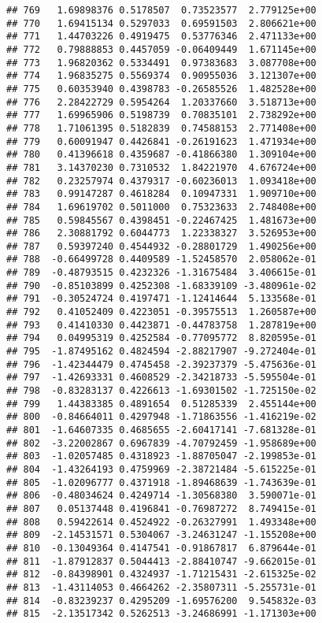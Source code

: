 \documentclass[
]{article}
\begin{document}
\begin{verbatim}
## 769   1.69898376 0.5178507  0.73523577  2.779125e+00
## 770   1.69415134 0.5297033  0.69591503  2.806621e+00
## 771   1.44703226 0.4919475  0.53776346  2.471133e+00
## 772   0.79888853 0.4457059 -0.06409449  1.671145e+00
## 773   1.96820362 0.5334491  0.97383683  3.087708e+00
## 774   1.96835275 0.5569374  0.90955036  3.121307e+00
## 775   0.60353940 0.4398783 -0.26585526  1.482528e+00
## 776   2.28422729 0.5954264  1.20337660  3.518713e+00
## 777   1.69965906 0.5198739  0.70835101  2.738292e+00
## 778   1.71061395 0.5182839  0.74588153  2.771408e+00
## 779   0.60091947 0.4426841 -0.26191623  1.471934e+00
## 780   0.41396618 0.4359687 -0.41866380  1.309104e+00
## 781   3.14370230 0.7310532  1.84221970  4.676724e+00
## 782   0.23257974 0.4379317 -0.60236013  1.093418e+00
## 783   0.99147287 0.4618284  0.10947331  1.909710e+00
## 784   1.69619702 0.5011000  0.75323633  2.748408e+00
## 785   0.59845567 0.4398451 -0.22467425  1.481673e+00
## 786   2.30881792 0.6044773  1.22338327  3.526953e+00
## 787   0.59397240 0.4544932 -0.28801729  1.490256e+00
## 788  -0.66499728 0.4409589 -1.52458570  2.058062e-01
## 789  -0.48793515 0.4232326 -1.31675484  3.406615e-01
## 790  -0.85103899 0.4252308 -1.68339109 -3.480961e-02
## 791  -0.30524724 0.4197471 -1.12414644  5.133568e-01
## 792   0.41052409 0.4223051 -0.39575513  1.260587e+00
## 793   0.41410330 0.4423871 -0.44783758  1.287819e+00
## 794   0.04995319 0.4252584 -0.77095772  8.820595e-01
## 795  -1.87495162 0.4824594 -2.88217907 -9.272404e-01
## 796  -1.42344479 0.4745458 -2.39237379 -5.475636e-01
## 797  -1.42693331 0.4608529 -2.34218733 -5.595504e-01
## 798  -0.83283137 0.4226613 -1.69301502 -1.725150e-02
## 799   1.44383385 0.4891654  0.51285339  2.455144e+00
## 800  -0.84664011 0.4297948 -1.71863556 -1.416219e-02
## 801  -1.64607335 0.4685655 -2.60417141 -7.681328e-01
## 802  -3.22002867 0.6967839 -4.70792459 -1.958689e+00
## 803  -1.02057485 0.4318923 -1.88705047 -2.199853e-01
## 804  -1.43264193 0.4759969 -2.38721484 -5.615225e-01
## 805  -1.02096777 0.4371918 -1.89468639 -1.743639e-01
## 806  -0.48034624 0.4249714 -1.30568380  3.590071e-01
## 807   0.05137448 0.4196841 -0.76987272  8.749415e-01
## 808   0.59422614 0.4524922 -0.26327991  1.493348e+00
## 809  -2.14531571 0.5304067 -3.24631247 -1.155208e+00
## 810  -0.13049364 0.4147541 -0.91867817  6.879644e-01
## 811  -1.87912837 0.5044413 -2.88410747 -9.662015e-01
## 812  -0.84398901 0.4324937 -1.71215431 -2.615325e-02
## 813  -1.43114053 0.4664262 -2.35807311 -5.255731e-01
## 814  -0.83239237 0.4295209 -1.69576200  9.545832e-03
## 815  -2.13517342 0.5262513 -3.24686991 -1.171303e+00

\end{verbatim}
\end{document}
